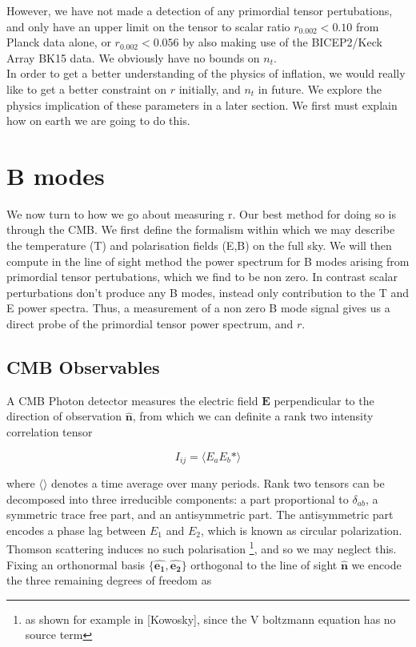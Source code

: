 \documentclass[a4paper,10pt]{article}
\renewcommand{\v}[1]{\mathbf{#1}}
\newcommand{\unit}[1]{\hat{\v{#1}}}
\begin{document}
However, we have not made a detection of any primordial tensor pertubations, and only have an upper limit on the tensor to scalar ratio $r_{0.002}<0.10$ from Planck data alone, or $r_{0.002}<0.056$ by also making use of the BICEP2/Keck Array BK15 data. We obviously have no bounds on $n_t$.\\

In order to get a better understanding of the physics of inflation, we would really like to get a better constraint on $r$ initially, and $n_t$ in future. We explore the physics implication of these parameters in a later section. We first must explain how on earth we are going to do this. 









\section{B modes}

We now turn to how we go about measuring r. Our best method for doing so is through the CMB. We first define the formalism within which we may describe the temperature (T) and polarisation fields (E,B) on the full sky. We will then compute in the line of sight method the power spectrum for B modes arising from primordial tensor pertubations, which we find to be non zero. In contrast scalar perturbations don't produce any B modes, instead only contribution to the T and E power spectra. Thus, a measurement of a non zero B mode signal gives us a direct probe of the primordial tensor power spectrum, and $r$. 

\subsection{CMB Observables}

A CMB Photon detector measures the electric field $\v{E}$ perpendicular to the direction of observation $\hat{\v{n}}$, from which we can definite a rank two intensity correlation tensor

\begin{equation}
I_{ij} = \langle E_aE_b* \rangle
\end{equation}

where $\langle\rangle$ denotes a time average over many periods. Rank two tensors can be decomposed into three irreducible components: a part proportional to $\delta_{ab}$, a symmetric trace free part, and an antisymmetric part. The antisymmetric part encodes a phase lag between $E_1$ and $E_2$, which is known as circular polarization. Thomson scattering induces no such polarisation \footnote{as shown for example in [Kowosky], since the V boltzmann equation has no source term}, and so we may neglect this. Fixing an orthonormal basis $\{\unit{e_1},\unit{e_2}\}$ orthogonal to the line of sight $\unit{n}$ we encode the three remaining degrees of freedom as 
\end{document}
